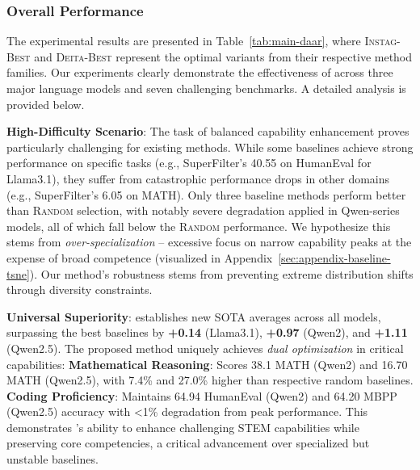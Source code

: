 \subsubsection{Overall Performance}

The experimental results are presented in Table~\ref{tab:main-daar}, where \textsc{Instag-Best} and \textsc{Deita-Best} represent the optimal variants from their respective method families. Our experiments clearly demonstrate the effectiveness of \ours across three major language models and seven challenging benchmarks. A detailed analysis is provided below.

\textbf{High-Difficulty Scenario}: The task of balanced capability enhancement proves particularly challenging for existing methods. While some baselines achieve strong performance on specific tasks (e.g., SuperFilter's 40.55 on HumanEval for Llama3.1), they suffer from catastrophic performance drops in other domains (e.g., SuperFilter's 6.05 on MATH). Only three baseline methods perform better than \textsc{Random} selection, with notably severe degradation applied in Qwen-series models, all of which fall below the \textsc{Random} performance. We hypothesize this stems from \textit{over-specialization} – excessive focus on narrow capability peaks at the expense of broad competence (visualized in Appendix~\ref{sec:appendix-baseline-tsne}). Our method's robustness stems from preventing extreme distribution shifts through diversity constraints.

\textbf{Universal Superiority}: \ours establishes new SOTA averages across all models, surpassing the best baselines by \textbf{+0.14} (Llama3.1), \textbf{+0.97} (Qwen2), and \textbf{+1.11} (Qwen2.5). The proposed method uniquely achieves \textit{dual optimization} in critical capabilities: \textbf{Mathematical Reasoning}: Scores 38.1 MATH (Qwen2) and 16.70 MATH (Qwen2.5), with 7.4\% and 27.0\% higher than respective random baselines. 
\textbf{Coding Proficiency}: Maintains 64.94 HumanEval (Qwen2) and 64.20 MBPP (Qwen2.5) accuracy with \textless1\% degradation from peak performance. This demonstrates \ours's ability to enhance challenging STEM capabilities while preserving core competencies, a critical advancement over specialized but unstable baselines.

